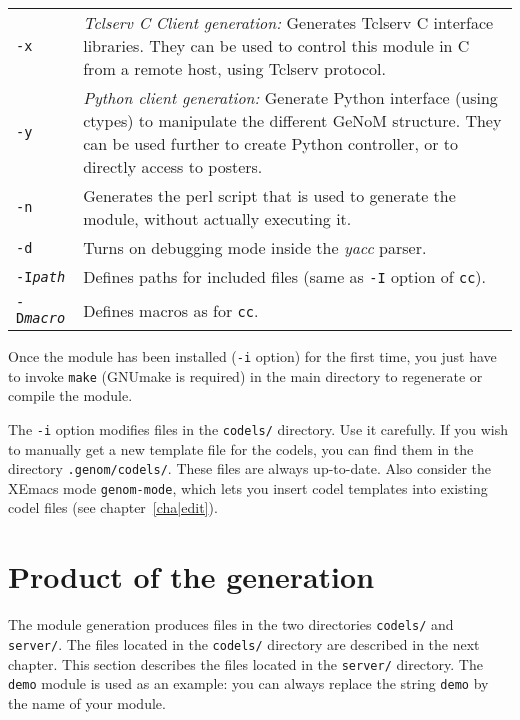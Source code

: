 \begin{description}
\begin{tabularx}{\linewidth}{lX}
\texttt{-x} & \emph{Tclserv C Client generation:} Generates Tclserv C interface
libraries. They can be used to control this module in C from a remote host, using
Tclserv protocol.\\

\texttt{-y} & \emph{Python client generation:} Generate Python interface (using
ctypes) to manipulate the different GeNoM structure. They can be used further to
create Python controller, or to directly access to posters. \\

\texttt{-n} & Generates the perl script that is used to generate the module,
without actually executing it.\\

\texttt{-d} & Turns on debugging mode inside the \emph{yacc} parser.\\

\texttt{-I\emph{path}} & Defines paths for included files (same as 
\texttt{-I} option of \texttt{cc}).\\

\texttt{-D\emph{macro}} & Defines macros as for \texttt{cc}.\\
\end{tabularx}

Once the module has been installed (\texttt{-i} option)  for the first time,
you just   have to invoke \texttt{make}   (GNUmake is required)  in the main
directory to regenerate or compile the module.

The \texttt{-i} option modifies files in the \texttt{codels/} directory. Use it
carefully.  If you wish  to manually  get a  new   template file for  the
codels, you can find them in the directory \texttt{.genom/codels/}.  These files
are always  up-to-date. Also consider the  XEmacs  mode \texttt{genom-mode},
which lets  you  insert codel templates  into  existing codel files  (see
chapter~\ref{cha|edit}).

\end{description}


\section{Product of the generation}

The module generation produces files in the two directories \texttt{codels/}
and \texttt{server/}.  The files located  in the  \texttt{codels/}  directory are
described in the next chapter.  This  section describes the files located
in  the  \texttt{server/} directory.   The \texttt{demo} module   is  used as an
example: you can always replace the string \texttt{demo} by the name of your
module.

